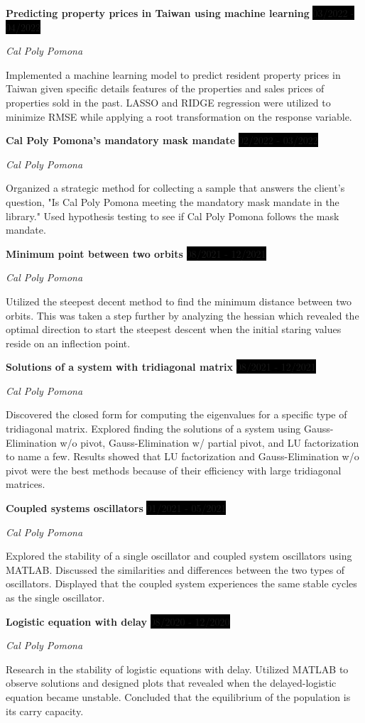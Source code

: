 \documentclass[paper=a4,fontsize=10pt]{scrartcl} %
\newcommand{\sepspace}{\vspace*{1em}}		%
\newcommand{\EducationEntry}[4]{
		\noindent \textbf{#1} \hfill      %
		\colorbox{Black}{%
			\parbox{5em}{%
			\hfill\color{White}#2}} \par  %
		\noindent \textit{#3} \par        %
		\noindent\hangindent=2em\hangafter=0 \small #4 %
		\normalsize \par}
\newcommand{\WorkEntry}[4]{				  %
		\noindent \textbf{#1} \hfill      %
		\colorbox{Black}{\color{White}#2} \par  %
		\noindent \textit{#3} \par              %
		\noindent \small #4 %
		\normalsize}
\begin{document}
\sepspace

\WorkEntry{Predicting property prices in Taiwan using machine learning}
{03/2022 - 04/2022}
{Cal Poly Pomona}
{Implemented a machine learning model to predict resident property prices in Taiwan given specific details features of the properties and sales prices of properties sold in the past.
LASSO and RIDGE regression were utilized to minimize RMSE while applying a root transformation on the response variable.}

\sepspace

\WorkEntry{Cal Poly Pomona's mandatory mask mandate}
{02/2022 - 03/2022}
{Cal Poly Pomona}
{Organized a strategic method for collecting a sample that answers the client's question, "Is Cal Poly Pomona meeting the mandatory mask mandate in the library." 
Used hypothesis testing to see if Cal Poly Pomona follows the mask mandate.}

\sepspace

\WorkEntry{Minimum point between two orbits}
{08/2021 - 12/2021}
{Cal Poly Pomona}
{Utilized the steepest decent method to find the minimum distance between two orbits.
This was taken a step further by analyzing the hessian which revealed the optimal direction to start the steepest descent when the initial staring values reside on an inflection point.
}
\sepspace

\WorkEntry{Solutions of a system with tridiagonal matrix}
{08/2021 - 12/2021}
{Cal Poly Pomona}
{Discovered the closed form for computing the eigenvalues for a specific type of tridiagonal
matrix. 
Explored finding the solutions of a system using Gauss-Elimination w/o pivot, Gauss-Elimination w/ partial pivot, and LU factorization to name a few. 
Results showed that LU factorization and Gauss-Elimination w/o pivot were the best methods because of their efficiency with large tridiagonal matrices.}

\sepspace

\WorkEntry{Coupled systems oscillators}
{01/2021 - 05/2021}
{Cal Poly Pomona}
{Explored the stability of a single oscillator and coupled system oscillators using MATLAB.
Discussed the similarities and differences between the two types of oscillators. 
Displayed that the coupled system experiences 
the same stable cycles as the single oscillator.}

\sepspace

\WorkEntry{Logistic equation with delay}
{08/2020 - 12/2020}
{Cal Poly Pomona}
{Research in the stability of logistic equations with delay. 
Utilized MATLAB to observe solutions and designed plots that revealed when the delayed-logistic equation became unstable. 
Concluded that the equilibrium
of the population is its carry capacity.}
\sepspace
\end{document}
